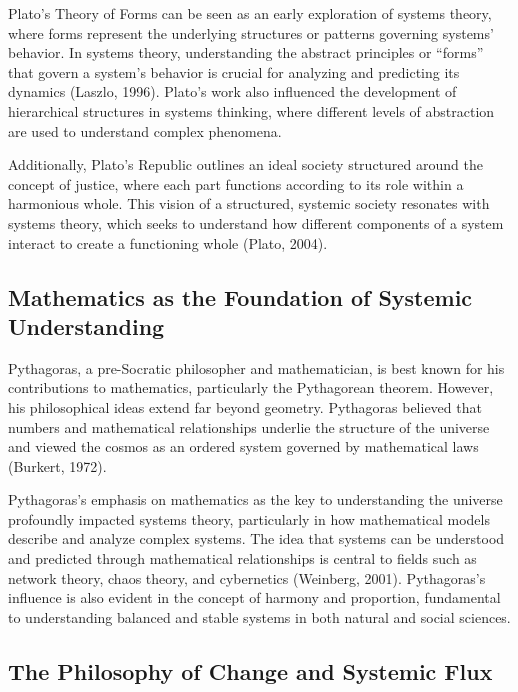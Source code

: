 \documentclass[twocolumn]{article}
\begin{document}
\textcolor{secondary}{Plato’s Theory of Forms can be seen as an early exploration of systems theory, where forms represent the underlying structures or patterns governing systems' behavior. In systems theory, understanding the abstract principles or “forms” that govern a system's behavior is crucial for analyzing and predicting its dynamics (Laszlo, 1996). Plato’s work also influenced the development of hierarchical structures in systems thinking, where different levels of abstraction are used to understand complex phenomena.}

\textcolor{primary}{Additionally, Plato's Republic outlines an ideal society structured around the concept of justice, where each part functions according to its role within a harmonious whole. This vision of a structured, systemic society resonates with systems theory, which seeks to understand how different components of a system interact to create a functioning whole (Plato, 2004).}

\subsection{Mathematics as the Foundation of Systemic Understanding}

\textcolor{primary}{Pythagoras, a pre-Socratic philosopher and mathematician, is best known for his contributions to mathematics, particularly the Pythagorean theorem. However, his philosophical ideas extend far beyond geometry. Pythagoras believed that numbers and mathematical relationships underlie the structure of the universe and viewed the cosmos as an ordered system governed by mathematical laws (Burkert, 1972).}

\textcolor{secondary}{Pythagoras’s emphasis on mathematics as the key to understanding the universe profoundly impacted systems theory, particularly in how mathematical models describe and analyze complex systems. The idea that systems can be understood and predicted through mathematical relationships is central to fields such as network theory, chaos theory, and cybernetics (Weinberg, 2001). Pythagoras's influence is also evident in the concept of harmony and proportion, fundamental to understanding balanced and stable systems in both natural and social sciences.}

\subsection{The Philosophy of Change and Systemic Flux}
\end{document}
